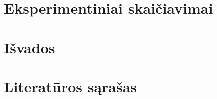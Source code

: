 \documentclass{ktu_phd_summary}
\begin{document}

% 

\clearpage

\section{Eksperimentiniai skaičiavimai}


\clearpage

\section{Išvados}


\clearpage

\section*{Literatūros sąrašas}

\begingroup
   \renewcommand{\section}[2]{}%
   
   
\endgroup
\end{document}
